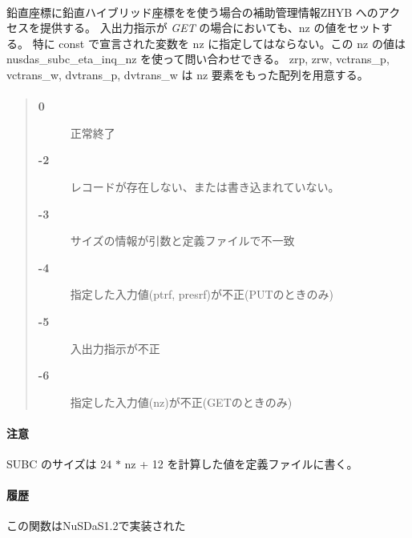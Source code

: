 \paragraph{\FuncDesc}鉛直座標に鉛直ハイブリッド座標をを使う場合の補助管理情報ZHYB
へのアクセスを提供する。
入出力指示が {\it GET} の場合においても、nz の値をセットする。
特に const で宣言された変数を nz に指定してはならない。この nz の値は
nusdas\_subc\_eta\_inq\_nz を使って問い合わせできる。
zrp, zrw, vctrans\_p, vctrans\_w, dvtrans\_p, dvtrans\_w は 
nz 要素をもった配列を用意する。
\paragraph{\ResultCode}
\begin{quote}
\begin{description}
\item[{\bf 0}] 正常終了
\item[{\bf -2}] レコードが存在しない、または書き込まれていない。
\item[{\bf -3}] サイズの情報が引数と定義ファイルで不一致
\item[{\bf -4}] 指定した入力値(ptrf, presrf)が不正(PUTのときのみ)
\item[{\bf -5}] 入出力指示が不正
\item[{\bf -6}] 指定した入力値(nz)が不正(GETのときのみ)
\end{description}\end{quote}
\paragraph{ 注意 }
SUBC のサイズは 24 $\ast$ nz + 12 を計算した値を定義ファイルに書く。
\paragraph{ 履歴 }
この関数はNuSDaS1.2で実装された
